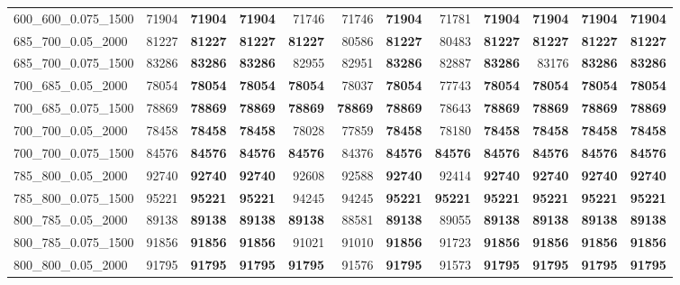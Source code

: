 \begin{landscape}
\begin{longtable}{lrrrrrrrrrrr}
600\_600\_0.075\_1500 & 71904 & \textbf{71904} & \textbf{71904} & 71746 & 71746 & \textbf{71904} & 71781 & \textbf{71904} & \textbf{71904} & \textbf{71904} & \textbf{71904}\\
685\_700\_0.05\_2000 & 81227 & \textbf{81227} & \textbf{81227} & \textbf{81227} & 80586 & \textbf{81227} & 80483 & \textbf{81227} & \textbf{81227} & \textbf{81227} & \textbf{81227}\\
685\_700\_0.075\_1500 & 83286 & \textbf{83286} & \textbf{83286} & 82955 & 82951 & \textbf{83286} & 82887 & \textbf{83286} & 83176 & \textbf{83286} & \textbf{83286}\\
700\_685\_0.05\_2000 & 78054 & \textbf{78054} & \textbf{78054} & \textbf{78054} & 78037 & \textbf{78054} & 77743 & \textbf{78054} & \textbf{78054} & \textbf{78054} & \textbf{78054}\\
700\_685\_0.075\_1500 & 78869 & \textbf{78869} & \textbf{78869} & \textbf{78869} & \textbf{78869} & \textbf{78869} & 78643 & \textbf{78869} & \textbf{78869} & \textbf{78869} & \textbf{78869}\\
700\_700\_0.05\_2000 & 78458 & \textbf{78458} & \textbf{78458} & 78028 & 77859 & \textbf{78458} & 78180 & \textbf{78458} & \textbf{78458} & \textbf{78458} & \textbf{78458}\\
700\_700\_0.075\_1500 & 84576 & \textbf{84576} & \textbf{84576} & \textbf{84576} & 84376 & \textbf{84576} & \textbf{84576} & \textbf{84576} & \textbf{84576} & \textbf{84576} & \textbf{84576}\\
785\_800\_0.05\_2000 & 92740 & \textbf{92740} & \textbf{92740} & 92608 & 92588 & \textbf{92740} & 92414 & \textbf{92740} & \textbf{92740} & \textbf{92740} & \textbf{92740}\\
785\_800\_0.075\_1500 & 95221 & \textbf{95221} & \textbf{95221} & 94245 & 94245 & \textbf{95221} & \textbf{95221} & \textbf{95221} & \textbf{95221} & \textbf{95221} & \textbf{95221}\\
800\_785\_0.05\_2000 & 89138 & \textbf{89138} & \textbf{89138} & \textbf{89138} & 88581 & \textbf{89138} & 89055 & \textbf{89138} & \textbf{89138} & \textbf{89138} & \textbf{89138}\\
800\_785\_0.075\_1500 & 91856 & \textbf{91856} & \textbf{91856} & 91021 & 91010 & \textbf{91856} & 91723 & \textbf{91856} & \textbf{91856} & \textbf{91856} & \textbf{91856}\\
800\_800\_0.05\_2000 & 91795 & \textbf{91795} & \textbf{91795} & \textbf{91795} & 91576 & \textbf{91795} & 91573 & \textbf{91795} & \textbf{91795} & \textbf{91795} & \textbf{91795}\\

\end{longtable}
\end{landscape}
